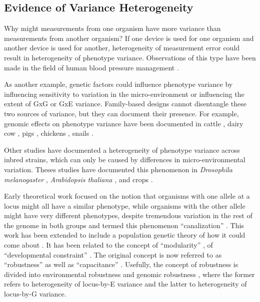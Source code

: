 \subsection{Evidence of Variance Heterogeneity}

Why might measurements from one organism have more variance than measurements from another organism?
If one device is used for one organism and another device is used for another, heterogeneity of measurement error could result in heterogeneity of phenotype variance.
Observations of this type have been made in the field of human blood pressure management \citep{Labarthe1973,Ataman1996,OBrien2001}.

As another example, genetic factors could influence phenotype variance by influencing sensitivity to variation in the micro-environment or influencing the extent of GxG or GxE variance.
Family-based designs cannot disentangle these two sources of variance, but they can document their presence.
For example, genomic effects on phenotype variance have been documented in cattle \citep{Visscher1992-ka,Mulder2008-pr,Fasoula2012-ji}, dairy cow \citep{clay1979heterogeneity}, pigs \citep{Ibanez-Escriche2008}, chickens \citep{Rowe2006}, snails \citep{Ros2004}.

Other studies have documented a heterogeneity of phenotype variance across inbred strains, which can only be caused by differences in micro-environmental variation.
Theses studies have documented this phenomenon in \textit{Drosophila melanogaster} \citep{Mackay2005,Mackay2014-vi}, \textit{Arabidopsis thaliana} \citep{Hall2007}, and crops \citep{Walsh2017-vx}.


Early theoretical work focused on the notion that organisms with one allele at a locus might all have a similar phenotype, while organisms with the other allele might have very different phenotypes, despite tremendous variation in the rest of the genome in both groups and termed this phenomenon ``canalization'' \citep{Waddington1942,Waddington1959}.
This work has been extended to include a population genetic theory of how it could come about \citep{Wagner1997,Gibson2000,Meiklejohn2002}.
It has been related to the concept of ``modularity'' \citep{Wagner2007}, of ``developmental constraint'' \citep{Pavlicev2015-nu}.
The original concept is now referred to as ``robustness'' \citep{Kitano2004,Felix2015,Yadav2015-sw,Fraser2010} as well as ``capacitance'' \citep{Pettersson2015-bl,Queitsch2002}.
Usefully, the concept of robustness is divided into environmental robustness and genomic robustness \citep{Fraser2010}, where the former refers to heterogeneity of locus-by-E variance and the latter to heterogeneity of locus-by-G variance.



